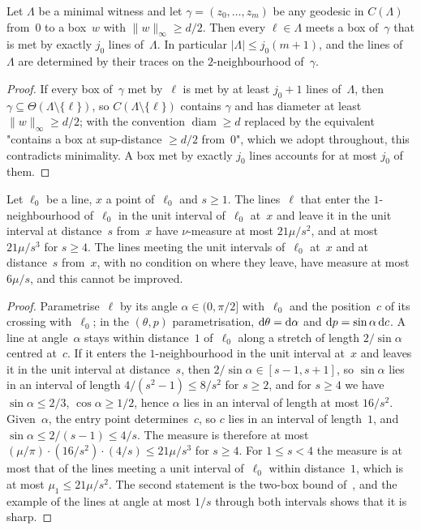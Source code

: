 \documentclass[11pt,letterpaper]{article}
\DeclareMathOperator{\diam}{diam}
\begin{document}
\begin{lemma}
\label{lem:critical}
Let $\Lambda$ be a minimal witness and let $\gamma=(z_0,\dots,z_m)$ be any geodesic in $C(\Lambda)$ from~$0$ to a box~$w$ with $\lVert w\rVert_\infty\ge d/2$. Then every $\ell\in\Lambda$ meets a box of~$\gamma$ that is met by exactly $j_0$ lines of~$\Lambda$. In particular $\lvert\Lambda\rvert\le j_0(m+1)$, and the lines of~$\Lambda$ are determined by their traces on the $2$-neighbourhood of~$\gamma$.
\end{lemma}

\begin{proof}
If every box of~$\gamma$ met by~$\ell$ is met by at least $j_0+1$ lines of~$\Lambda$, then $\gamma\subseteq\Theta(\Lambda\setminus\{\ell\})$, so $C(\Lambda\setminus\{\ell\})$ contains $\gamma$ and has diameter at least $\lVert w\rVert_\infty\ge d/2$; with the convention $\diam\ge d$ replaced by the equivalent "contains a box at sup-distance $\ge d/2$ from~$0$", which we adopt throughout, this contradicts minimality. A box met by exactly $j_0$ lines accounts for at most $j_0$ of them.
\end{proof}

\begin{lemma}
\label{lem:exit}
Let $\ell_0$ be a line, $x$ a point of~$\ell_0$ and $s\ge1$. The lines~$\ell$ that enter the $1$-neighbourhood of~$\ell_0$ in the unit interval of~$\ell_0$ at~$x$ and leave it in the unit interval at distance~$s$ from~$x$ have $\nu$-measure at most $21\mu/s^2$, and at most $21\mu/s^3$ for $s\ge4$. The lines meeting the unit intervals of~$\ell_0$ at~$x$ and at distance~$s$ from~$x$, with no condition on where they leave, have measure at most $6\mu/s$, and this cannot be improved.
\end{lemma}

\begin{proof}
Parametrise~$\ell$ by its angle $\alpha\in(0,\pi/2]$ with~$\ell_0$ and the position~$c$ of its crossing with~$\ell_0$; in the $(\theta,p)$ parametrisation, $\mathrm{d}\theta=\mathrm{d}\alpha$ and $\mathrm{d} p=\sin\alpha\,\mathrm{d} c$. A line at angle~$\alpha$ stays within distance~$1$ of~$\ell_0$ along a stretch of length $2/\sin\alpha$ centred at~$c$. If it enters the $1$-neighbourhood in the unit interval at~$x$ and leaves it in the unit interval at distance~$s$, then $2/\sin\alpha\in[s-1,s+1]$, so $\sin\alpha$ lies in an interval of length $4/(s^2-1)\le8/s^2$ for $s\ge2$, and for $s\ge4$ we have $\sin\alpha\le2/3$, $\cos\alpha\ge1/2$, hence $\alpha$ lies in an interval of length at most $16/s^2$. Given~$\alpha$, the entry point determines~$c$, so $c$ lies in an interval of length~$1$, and $\sin\alpha\le2/(s-1)\le4/s$. The measure is therefore at most $(\mu/\pi)\cdot(16/s^2)\cdot(4/s)\le21\mu/s^3$ for $s\ge4$. For $1\le s<4$ the measure is at most that of the lines meeting a unit interval of~$\ell_0$ within distance~$1$, which is at most $\mu_1\le21\mu/s^2$. The second statement is the two-box bound of~\cite[Lemma~3.2]{HJ26b}, and the example of the lines at angle at most $1/s$ through both intervals shows that it is sharp.
\end{proof}
\end{document}
